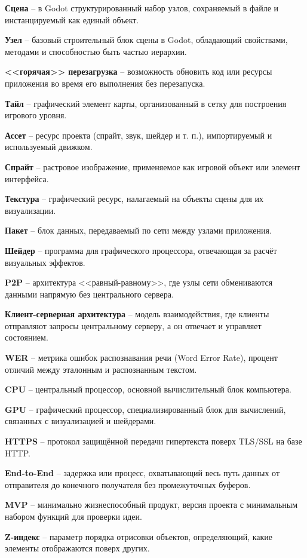 \textbf{Сцена} -- в Godot структурированный набор узлов, сохраняемый в файле и инстанцируемый как единый объект.

\textbf{Узел} -- базовый строительный блок сцены в Godot, обладающий свойствами, методами и способностью быть частью иерархии.

\textbf{<<горячая>> перезагрузка} -- возможность обновить код или ресурсы приложения во время его выполнения без перезапуска.

\textbf{Тайл} -- графический элемент карты, организованный в сетку для построения игрового уровня.

\textbf{Ассет} -- ресурс проекта (спрайт, звук, шейдер и т. п.), импортируемый и используемый движком.

\textbf{Спрайт} -- растровое изображение, применяемое как игровой объект или элемент интерфейса.

\textbf{Текстура} -- графический ресурс, налагаемый на объекты сцены для их визуализации.

\textbf{Пакет} -- блок данных, передаваемый по сети между узлами приложения.

\textbf{Шейдер} -- программа для графического процессора, отвечающая за расчёт визуальных эффектов.

\textbf{P2P} -- архитектура <<равный-равному>>, где узлы сети обмениваются данными напрямую без центрального сервера.

\textbf{Клиент-серверная архитектура} -- модель взаимодействия, где клиенты отправляют запросы центральному серверу, а он отвечает и управляет состоянием.

\textbf{WER} -- метрика ошибок распознавания речи (Word Error Rate), процент отличий между эталонным и распознанным текстом.

\textbf{CPU} -- центральный процессор, основной вычислительный блок компьютера.

\textbf{GPU} -- графический процессор, специализированный блок для вычислений, связанных с визуализацией и шейдерами.

\textbf{HTTPS} -- протокол защищённой передачи гипертекста поверх TLS/SSL на базе HTTP.

\textbf{End-to-End} -- задержка или процесс, охватывающий весь путь данных от отправителя до конечного получателя без промежуточных буферов.

\textbf{MVP} -- минимально жизнеспособный продукт, версия проекта с минимальным набором функций для проверки идеи.

\textbf{Z-индекс} -- параметр порядка отрисовки объектов, определяющий, какие элементы отображаются поверх других.

